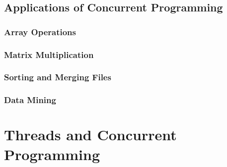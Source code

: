 \documentclass[12pt letter]{report}
\begin{document}
\subsection{Applications of Concurrent Programming}

\subsubsection{Array Operations}

\subsubsection{Matrix Multiplication}

\subsubsection{Sorting and Merging Files}

\subsubsection{Data Mining}

\section{Threads and Concurrent Programming}
\end{document}
